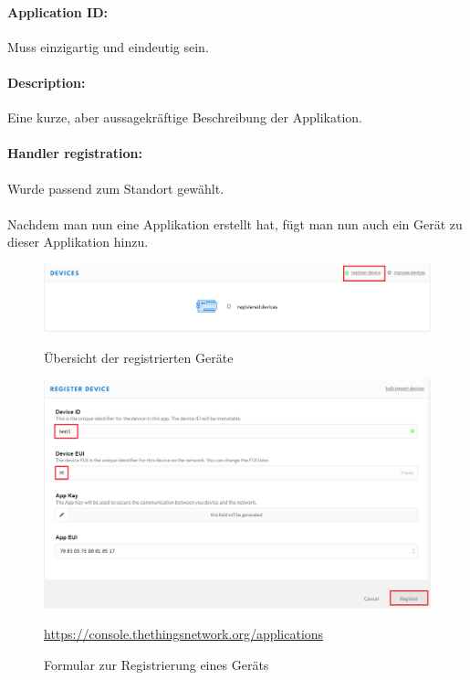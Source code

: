 \paragraph{Application ID:} Muss einzigartig und eindeutig sein.
\paragraph{Description:} Eine kurze, aber aussagekräftige Beschreibung der Applikation.
\paragraph{Handler registration:} Wurde passend zum Standort gewählt.\\
\\
Nachdem man nun eine Applikation erstellt hat, fügt man nun auch ein Gerät zu dieser Applikation hinzu.
\begin{figure}[H]
    \center
    \includegraphics[width=16cm]{Bilder/lora-4.png}\\
    \caption{Übersicht der registrierten Geräte}
\end{figure}
\begin{figure}[H]
    \center
    \includegraphics[width=16cm]{Bilder/lora-5.png}\\
    \caption{Formular zur Registrierung eines Geräts}
    \begin{center} \quelle\url{https://console.thethingsnetwork.org/applications} \end{center}
\end{figure}
\newpage
